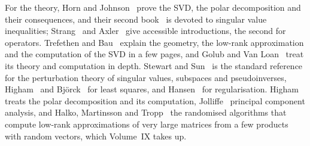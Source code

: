 For the theory, Horn and Johnson~\cite[Sects.~2.6, 7.3 and~7.4]{horn2013} prove the SVD, the polar decomposition and their consequences, and their second book~\cite[Chap.~3]{horn1991topics} is devoted to singular value inequalities; Strang~\cite{strang2016} and Axler~\cite[Chap.~7]{axler2024} give accessible introductions, the second for operators. Trefethen and Bau~\cite[Lectures~4, 5 and~31]{trefethen1997} explain the geometry, the low-rank approximation and the computation of the SVD in a few pages, and Golub and Van Loan~\cite[Sects.~2.4 and~8.6]{golub2013} treat its theory and computation in depth. Stewart and Sun~\cite{stewartsun1990} is the standard reference for the perturbation theory of singular values, subspaces and pseudoinverses, Higham~\cite[Chap.~20]{higham2002accuracy} and Bj\"orck~\cite{bjorck1996} for least squares, and Hansen~\cite{hansen1998} for regularisation. Higham~\cite[Chap.~8]{higham2008} treats the polar decomposition and its computation, Jolliffe~\cite{jolliffe2002} principal component analysis, and Halko, Martinsson and Tropp~\cite{halko2011} the randomised algorithms that compute low-rank approximations of very large matrices from a few products with random vectors, which Volume~IX takes up.

\chapterreferences
